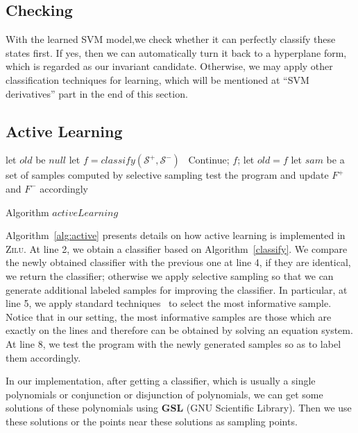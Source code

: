 \subsection{Checking}
With the learned SVM model,we check whether it can perfectly classify these states first.
If yes, then we can automatically turn it back to a hyperplane form, which is regarded as our invariant candidate.
Otherwise, we may apply other classification techniques for learning, which will be mentioned at ``SVM derivatives'' part in the end of this section.


\subsection{Active Learning} 
\begin{algorithm}[h]
\SetAlgoVlined
\Indm
{}
\Indp
let $old$ be $null$\;
 {
    let $f = classify(\mathcal{S}^+, \mathcal{S}^-)$\;
     {
    	\ Continue;
    }
     {
        \Return $f$;
    }
    let $old = f$\;
    let $sam$ be a set of samples computed by selective sampling\;
    test the program and update $F^+$ and $F^-$ accordingly\;
}
\caption{Algorithm $activeLearning$}
\label{alg:active}
\end{algorithm}

Algorithm~\ref{alg:active} presents details on how active learning is implemented in \textsc{Zilu}. 
At line 2, we obtain a classifier based on Algorithm~\ref{classify}. 
We compare the newly obtained classifier with the previous one at line 4, if they are identical, we return the classifier; 
otherwise we apply selective sampling so that we can generate additional labeled samples for improving the classifier. 
In particular, at line 5, we apply standard techniques~\cite{DBLP:conf/icml/SchohnC00} to select the most informative sample. 
Notice that in our setting, the most informative samples are those which are exactly on the lines and therefore can be obtained by solving an equation system. 
At line 8, we test the program with the newly generated samples so as to label them accordingly.

In our implementation, after getting a classifier, which is usually a single polynomials or conjunction or disjunction of polynomials,
we can get some solutions of these polynomials using \textbf{GSL} (GNU Scientific Library).
Then we use these solutions or the points near these solutions as sampling points.



